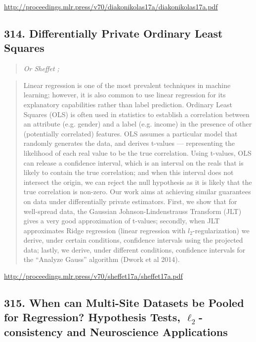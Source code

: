 \documentclass{article}
\begin{document}
\href{http://proceedings.mlr.press/v70/diakonikolas17a/diakonikolas17a.pdf}{http://proceedings.mlr.press/v70/diakonikolas17a/diakonikolas17a.pdf}

\subsection{314. Differentially Private Ordinary Least Squares}

\begin{quote}
\footnotesize{\textit{Or Sheffet ;}}

\end{quote}

\begin{quote}
    Linear regression is one of the most prevalent techniques in machine learning; however, it is also common to use linear regression for its explanatory capabilities rather than label prediction. Ordinary Least Squares (OLS) is often used in statistics to establish a correlation between an attribute (e.g. gender) and a label (e.g. income) in the presence of other (potentially correlated) features. OLS assumes a particular model that randomly generates the data, and derives t-values — representing the likelihood of each real value to be the true correlation. Using t-values, OLS can release a confidence interval, which is an interval on the reals that is likely to contain the true correlation; and when this interval does not intersect the origin, we can reject the null hypothesis as it is likely that the true correlation is non-zero. Our work aims at achieving similar guarantees on data under differentially private estimators. First, we show that for well-spread data, the Gaussian Johnson-Lindenstrauss Transform (JLT) gives a very good approximation of t-values; secondly, when JLT approximates Ridge regression (linear regression with $l_2$-regularization) we derive, under certain conditions, confidence intervals using the projected data; lastly, we derive, under different conditions, confidence intervals for the “Analyze Gauss” algorithm (Dwork et al 2014).  
\end{quote}

\href{http://proceedings.mlr.press/v70/sheffet17a/sheffet17a.pdf}{http://proceedings.mlr.press/v70/sheffet17a/sheffet17a.pdf}

\subsection{315. When can Multi-Site Datasets be Pooled for Regression? Hypothesis Tests, $\ell_2$-consistency and Neuroscience Applications}
\end{document}

